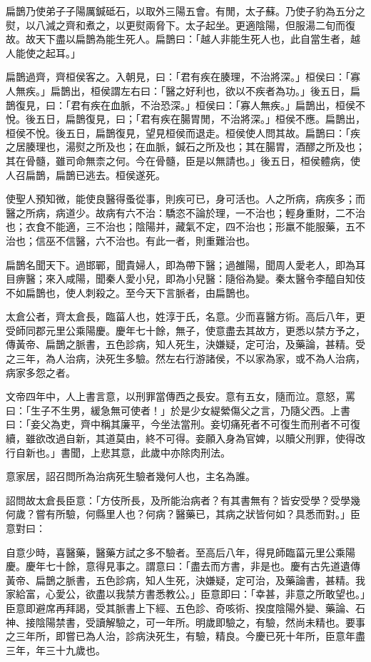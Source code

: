 \begin{pinyinscope}
扁鵲乃使弟子子陽厲鍼砥石，以取外三陽五會。有閒，太子蘇。乃使子豹為五分之熨，以八減之齊和煮之，以更熨兩脅下。太子起坐。更適陰陽，但服湯二旬而復故。故天下盡以扁鵲為能生死人。扁鵲曰：「越人非能生死人也，此自當生者，越人能使之起耳。」

扁鵲過齊，齊桓侯客之。入朝見，曰：「君有疾在腠理，不治將深。」桓侯曰：「寡人無疾。」扁鵲出，桓侯謂左右曰：「醫之好利也，欲以不疾者為功。」後五日，扁鵲復見，曰：「君有疾在血脈，不治恐深。」桓侯曰：「寡人無疾。」扁鵲出，桓侯不悅。後五日，扁鵲復見，曰；「君有疾在腸胃閒，不治將深。」桓侯不應。扁鵲出，桓侯不悅。後五日，扁鵲復見，望見桓侯而退走。桓侯使人問其故。扁鵲曰：「疾之居腠理也，湯熨之所及也；在血脈，鍼石之所及也；其在腸胃，酒醪之所及也；其在骨髓，雖司命無柰之何。今在骨髓，臣是以無請也。」後五日，桓侯體病，使人召扁鵲，扁鵲已逃去。桓侯遂死。

使聖人預知微，能使良醫得蚤從事，則疾可已，身可活也。人之所病，病疾多；而醫之所病，病道少。故病有六不治：驕恣不論於理，一不治也；輕身重財，二不治也；衣食不能適，三不治也；陰陽并，藏氣不定，四不治也；形羸不能服藥，五不治也；信巫不信醫，六不治也。有此一者，則重難治也。

扁鵲名聞天下。過邯鄲，聞貴婦人，即為帶下醫；過雒陽，聞周人愛老人，即為耳目痹醫；來入咸陽，聞秦人愛小兒，即為小兒醫：隨俗為變。秦太醫令李醯自知伎不如扁鵲也，使人刺殺之。至今天下言脈者，由扁鵲也。

太倉公者，齊太倉長，臨菑人也，姓淳于氏，名意。少而喜醫方術。高后八年，更受師同郡元里公乘陽慶。慶年七十餘，無子，使意盡去其故方，更悉以禁方予之，傳黃帝、扁鵲之脈書，五色診病，知人死生，決嫌疑，定可治，及藥論，甚精。受之三年，為人治病，決死生多驗。然左右行游諸侯，不以家為家，或不為人治病，病家多怨之者。

文帝四年中，人上書言意，以刑罪當傳西之長安。意有五女，隨而泣。意怒，罵曰：「生子不生男，緩急無可使者！」於是少女緹縈傷父之言，乃隨父西。上書曰：「妾父為吏，齊中稱其廉平，今坐法當刑。妾切痛死者不可復生而刑者不可復續，雖欲改過自新，其道莫由，終不可得。妾願入身為官婢，以贖父刑罪，使得改行自新也。」書聞，上悲其意，此歲中亦除肉刑法。

意家居，詔召問所為治病死生驗者幾何人也，主名為誰。

詔問故太倉長臣意：「方伎所長，及所能治病者？有其書無有？皆安受學？受學幾何歲？嘗有所驗，何縣里人也？何病？醫藥已，其病之狀皆何如？具悉而對。」臣意對曰：

自意少時，喜醫藥，醫藥方試之多不驗者。至高后八年，得見師臨菑元里公乘陽慶。慶年七十餘，意得見事之。謂意曰：「盡去而方書，非是也。慶有古先道遺傳黃帝、扁鵲之脈書，五色診病，知人生死，決嫌疑，定可治，及藥論書，甚精。我家給富，心愛公，欲盡以我禁方書悉教公。」臣意即曰：「幸甚，非意之所敢望也。」臣意即避席再拜謁，受其脈書上下經、五色診、奇咳術、揆度陰陽外變、藥論、石神、接陰陽禁書，受讀解驗之，可一年所。明歲即驗之，有驗，然尚未精也。要事之三年所，即嘗已為人治，診病決死生，有驗，精良。今慶已死十年所，臣意年盡三年，年三十九歲也。


\end{pinyinscope}
